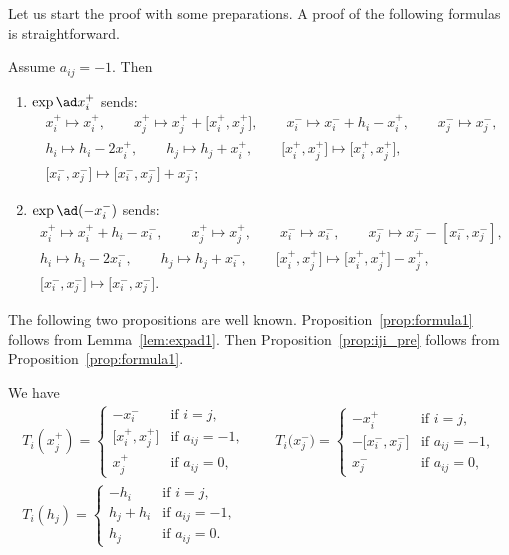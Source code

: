 Let us start the proof with some preparations. A proof of the following formulas is straightforward.
\begin{lem}\label{lem:expad1} Assume $a_{ij}=-1$. Then
\begin{enumerate}\itemsep=0pt
\item $\exp\ad x_{i}^{+}$ sends:
\begin{gather*}
x_i^+ \mapsto x_i^+, \qquad x_j^+ \mapsto x_j^+ + \big[x_i^+,x_j^+\big],\qquad x_i^- \mapsto x_i^-+h_i-x_i^+, \qquad x_j^- \mapsto x_j^-,\\
h_i \mapsto h_i-2x_i^+,\qquad h_j \mapsto h_j+x_i^+,\qquad \big[x_i^+,x_j^+\big] \mapsto \big[x_i^+,x_j^+\big],\\
 \big[x_i^-,x_j^-\big] \mapsto \big[x_i^-,x_j^-\big] + x_j^-;
\end{gather*}
\item $\exp\ad (-x_{i}^{-})$ sends:
\begin{gather*}
x_i^+ \mapsto x_i^++h_i-x_i^-, \qquad x_j^+ \mapsto x_j^+,\qquad x_i^- \mapsto x_i^-, \qquad x_j^- \mapsto x_j^--[x_i^-,x_j^-],\\
h_i \mapsto h_i-2x_i^-,\qquad h_j \mapsto h_j+x_i^-,\qquad \big[x_i^+,x_j^+\big] \mapsto \big[x_i^+,x_j^+\big]-x_j^+,\\
 \big[x_i^-,x_j^-\big] \mapsto \big[x_i^-,x_j^-\big].
\end{gather*}
\end{enumerate}
\end{lem}

The following two propositions are well known. Proposition~\ref{prop:formula1} follows from Lemma~\ref{lem:expad1}. Then Proposition~\ref{prop:iji_pre} follows from Proposition~\ref{prop:formula1}.
\begin{prop}\label{prop:formula1} We have
\begin{gather*}
T_i(x_j^+) = \begin{cases}
-x_i^- & \text{if $i=j$},\\
\big[x_i^+,x_j^+\big] & \text{if $a_{ij}=-1$},\\
x_j^+ & \text{if $a_{ij}=0$},
\end{cases}\qquad
T_i\big(x_j^-\big) = \begin{cases}
-x_i^+ & \text{if $i=j$},\\
-\big[x_i^-,x_j^-\big] & \text{if $a_{ij}=-1$},\\
x_j^- & \text{if $a_{ij}=0$},
\end{cases}
\\
T_i(h_j) = \begin{cases}
-h_i & \text{if $i=j$},\\
h_j + h_i & \text{if $a_{ij}=-1$},\\
h_j & \text{if $a_{ij}=0$}.
\end{cases}
\end{gather*}
\end{prop}

